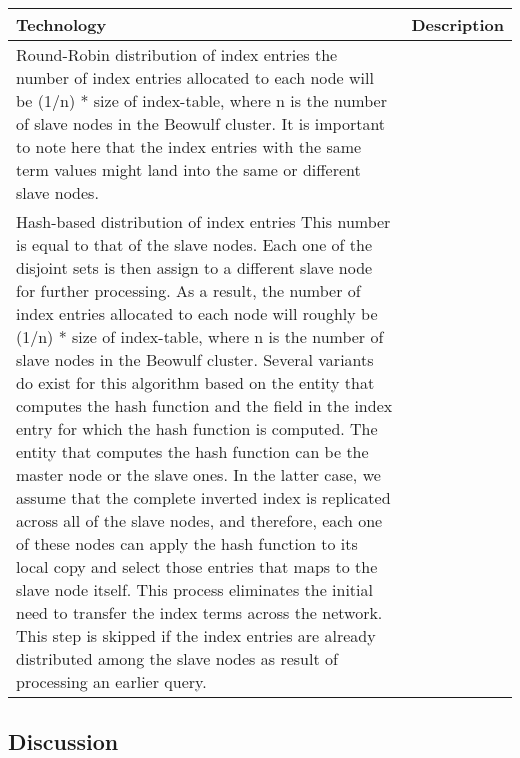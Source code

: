 \begin{center}
    \begin{tabular}{ | l | p{10cm} |} 
    \hline
    Technology & Description    \\ \hline
    Round-Robin distribution of index entries 
    the number of index entries allocated to each node will be (1/n) * size of index-table, where n is the number of slave nodes in the      Beowulf cluster. It is important to note here that the index entries with the same term values might land into the same or different slave nodes.   \\ \hline
    Hash-based distribution of index entries
    This number is equal to that of the slave nodes. Each one of the disjoint sets is then assign to a different slave node for further processing. As a result, the number of index entries allocated to each node will roughly be (1/n) * size of index-table, where n is the number of slave nodes in the Beowulf cluster. Several variants do exist for this algorithm based on the entity that computes the hash function and the field in the index entry for which the hash function is computed. The entity that computes the hash function can be the master node or the slave ones. In the latter case, we assume that the complete inverted index is replicated across all of the slave nodes, and therefore, each one of these nodes can apply the hash function to its local copy and select those entries that maps to the slave node itself. This process eliminates the initial need to transfer the index terms across the network. This step is skipped if the index entries are already distributed among the slave nodes as result of processing an earlier query. \\ \hline
    \end{tabular}
\end{center}

\subsection{Discussion}

